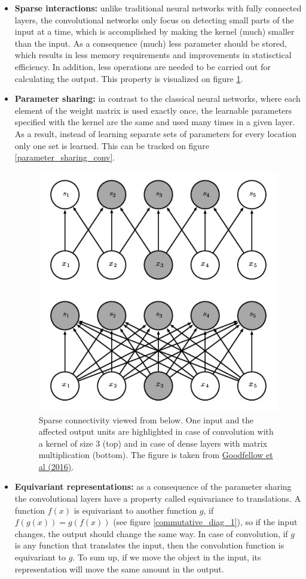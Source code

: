 \documentclass[12pt]{article}
\theoremstyle{plain}
\begin{document}
\begin{itemize}
	\item \textbf{Sparse interactions:} unlike traditional neural networks with fully connected layers, the convolutional networks only focus on detecting small parts of the input at a time, which is accomplished by making the kernel (much) smaller than the input. As a consequence (much) less parameter should be stored, which results in less memory requirements and improvements in statisctical efficiency. In addition, less operations are needed to be carried out for calculating the output. This property is visualized on figure \ref{sparse_connect_conv}.
	
	\item \textbf{Parameter sharing:} in contrast to the classical neural networks, where each element of the weight matrix is used exactly once, the learnable parameters specified with the kernel are the same and used many times in a given layer. As a result, instead of learning separate sets of parameters for every location only one set is learned. This can be tracked on figure \ref{parameter_sharing_conv}.

\begin{figure}[h]
	\begin{center}
	\includegraphics[width=0.5\linewidth]{media/sparce_connect_1.png}
	\caption{Sparse connectivity viewed from below. One input and the affected output units are highlighted in case of convolution with a kernel of size $3$ (top) and in case of dense layers with matrix multiplication (bottom). The figure is taken from \protect\hyperlink{Deeplea_Goodfellow}{Goodfellow et al (2016)}. }
	\label{sparse_connect_conv}
	\end{center}
\end{figure}

	\item \textbf{Equivariant representations:} as a consequence of the parameter sharing the convolutional layers have a property called equivariance to translations. A function $f(x)$ is equivariant to another function $g$, if $f\left(g(x)\right) = g\left(f(x)\right)$ (see figure \ref{commutative_diag_1}), so if the input changes, the output should change the same way. In case of convolution, if $g$ is any function that translates the input, then the convolution function is equivariant to $g$. To sum up, if we move the object in the input, its representation will move the same amount in the output.



\end{itemize}
\end{document}
